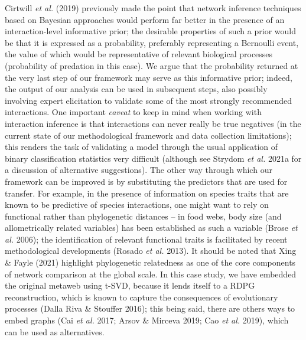 \documentclass[10pt,oneside]{article}
\begin{document}
Cirtwill \emph{et al.} (2019) previously made the point that network
inference techniques based on Bayesian approaches would perform far
better in the presence of an interaction-level informative prior; the
desirable properties of such a prior would be that it is expressed as a
probability, preferably representing a Bernoulli event, the value of
which would be representative of relevant biological processes
(probability of predation in this case). We argue that the probability
returned at the very last step of our framework may serve as this
informative prior; indeed, the output of our analysis can be used in
subsequent steps, also possibly involving expert elicitation to validate
some of the most strongly recommended interactions. One important
\emph{caveat} to keep in mind when working with interaction inference is
that interactions can never really be true negatives (in the current
state of our methodological framework and data collection limitations);
this renders the task of validating a model through the usual
application of binary classification statistics very difficult (although
see Strydom \emph{et al.} 2021a for a discussion of alternative
suggestions). The other way through which our framework can be improved
is by substituting the predictors that are used for transfer. For
example, in the presence of information on species traits that are known
to be predictive of species interactions, one might want to rely on
functional rather than phylogenetic distances -- in food webs, body size
(and allometrically related variables) has been established as such a
variable (Brose \emph{et al.} 2006); the identification of relevant
functional traits is facilitated by recent methodological developments
(Rosado \emph{et al.} 2013). It should be noted that Xing \& Fayle
(2021) highlight phylogenetic relatedness as one of the core components
of network comparison at the global scale. In this case study, we have
embedded the original metaweb using t-SVD, because it lends itself to a
RDPG reconstruction, which is known to capture the consequences of
evolutionary processes (Dalla Riva \& Stouffer 2016); this being said,
there are others ways to embed graphs (Cai \emph{et al.} 2017; Arsov \&
Mirceva 2019; Cao \emph{et al.} 2019), which can be used as
alternatives.
\end{document}

